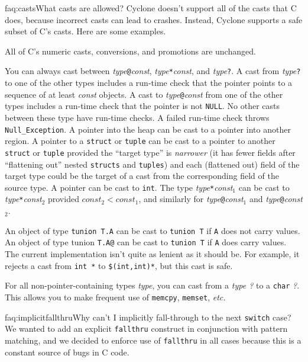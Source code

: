 \begin{faqa}{faq:casts}{What casts are allowed?}
Cyclone doesn't support all of the casts that C does, because
incorrect casts can lead to crashes.  Instead, Cyclone supports a safe
subset of C's casts.  Here are some examples.

All of C's numeric casts, conversions, and promotions are unchanged.

You can always cast between
\textit{type}\texttt{@}\lb\textit{const}\rb,
\textit{type}\texttt{*}\lb\textit{const}\rb, and
\textit{type}\texttt{?}.
A cast from 
\textit{type}\texttt{?}
to one of the other types includes a run-time check that the pointer
points to a sequence of at least \textit{const} objects.
A cast to
\textit{type}\texttt{@}\lb\textit{const}\rb
from one of the
other types includes a run-time check that the pointer is not
\texttt{NULL}.
No other casts between these type have run-time checks.
A failed run-time check throws \texttt{Null_Exception}.
A pointer into the heap can be cast to a pointer into another region.
A pointer to a \texttt{struct} or \texttt{tuple} can be
cast to a pointer to another \texttt{struct} or \texttt{tuple}
provided the ``target type'' 
is \emph{narrower} (it has fewer fields after ``flattening out'' nested
\texttt{structs} and \texttt{tuples}) and each (flattened out) field
of the target type could be the target of a cast from the
corresponding field of the source type.
A pointer can be cast to \texttt{int}.
The type
\textit{type}\texttt{*}\lb\textit{const}$_1$\rb
can be cast to
\textit{type}\texttt{*}\lb\textit{const}$_2$\rb
provided
$\textit{const}_2 < \textit{const}_1$, and similarly for
\textit{type}\texttt{@}\lb\textit{const}$_1$\rb
and
\textit{type}\texttt{@}\lb\textit{const}$_2$\rb.

An object of type \texttt{tunion T.A} can be cast to \texttt{tunion T}
if \texttt{A} does not carry values.  An object of type tunion
\texttt{T.A@} can be cast to \texttt{tunion T} if \texttt{A} does
carry values.  The current implementation isn't quite as lenient as it
should be.  For example, it rejects a cast from \texttt{int *\rb} to
\texttt{\$(int,int)*\rb}, but this cast is safe.

For all non-pointer-containing types \textit{type}, you can cast from a
\textit{type ?} to a \texttt{char} \textit{?}.  This allows you to make
frequent use of \texttt{memcpy}, \texttt{memset}, \emph{etc.}
\end{faqa}

\begin{faqa}{faq:implicitfallthru}{Why can't I implicitly fall-through to the next \texttt{switch} case?}
We wanted to add an explicit \texttt{fallthru} construct in
conjunction with pattern matching, and we decided to enforce use of
\texttt{fallthru} in all cases because this is a constant source of
bugs in C code.
\end{faqa}

